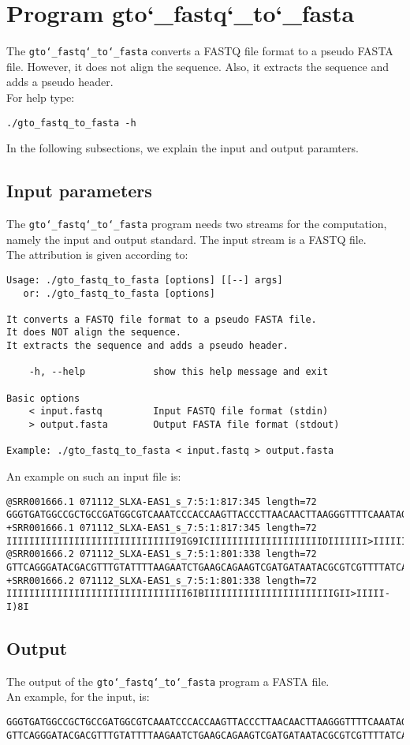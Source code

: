 \section{Program gto\char`_fastq\char`_to\char`_fasta}
The \texttt{gto\char`_fastq\char`_to\char`_fasta} converts a FASTQ file format to a pseudo FASTA file. However, it does not align the sequence. Also, it extracts the sequence and adds a pseudo header.\\
For help type:
\begin{lstlisting}
./gto_fastq_to_fasta -h
\end{lstlisting}
In the following subsections, we explain the input and output paramters.

\subsection*{Input parameters}

The \texttt{gto\char`_fastq\char`_to\char`_fasta} program needs two streams for the computation,
namely the input and output standard. The input stream is a FASTQ file.\\
The attribution is given according to:
\begin{lstlisting}
Usage: ./gto_fastq_to_fasta [options] [[--] args]
   or: ./gto_fastq_to_fasta [options]

It converts a FASTQ file format to a pseudo FASTA file.
It does NOT align the sequence.
It extracts the sequence and adds a pseudo header.

    -h, --help            show this help message and exit

Basic options
    < input.fastq         Input FASTQ file format (stdin)
    > output.fasta        Output FASTA file format (stdout)

Example: ./gto_fastq_to_fasta < input.fastq > output.fasta
\end{lstlisting}
An example on such an input file is:
\begin{lstlisting}
@SRR001666.1 071112_SLXA-EAS1_s_7:5:1:817:345 length=72
GGGTGATGGCCGCTGCCGATGGCGTCAAATCCCACCAAGTTACCCTTAACAACTTAAGGGTTTTCAAATAGA
+SRR001666.1 071112_SLXA-EAS1_s_7:5:1:817:345 length=72
IIIIIIIIIIIIIIIIIIIIIIIIIIIIII9IG9ICIIIIIIIIIIIIIIIIIIIIDIIIIIII>IIIIII/
@SRR001666.2 071112_SLXA-EAS1_s_7:5:1:801:338 length=72
GTTCAGGGATACGACGTTTGTATTTTAAGAATCTGAAGCAGAAGTCGATGATAATACGCGTCGTTTTATCAT
+SRR001666.2 071112_SLXA-EAS1_s_7:5:1:801:338 length=72
IIIIIIIIIIIIIIIIIIIIIIIIIIIIIIII6IBIIIIIIIIIIIIIIIIIIIIIIIGII>IIIII-I)8I
\end{lstlisting}

\subsection*{Output}
The output of the \texttt{gto\char`_fastq\char`_to\char`_fasta} program a FASTA file.\\
An example, for the input, is:
\begin{lstlisting}
GGGTGATGGCCGCTGCCGATGGCGTCAAATCCCACCAAGTTACCCTTAACAACTTAAGGGTTTTCAAATAGA
GTTCAGGGATACGACGTTTGTATTTTAAGAATCTGAAGCAGAAGTCGATGATAATACGCGTCGTTTTATCAT
\end{lstlisting}
